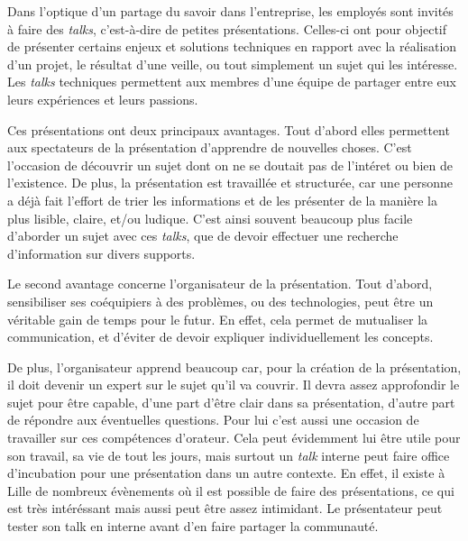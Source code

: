 \bigskip

Dans l'optique d'un partage du savoir dans l'entreprise, les employés
sont invités à faire des \emph{talks}, c'est-à-dire de petites
présentations. Celles-ci ont pour objectif de présenter certains enjeux
et solutions techniques en rapport avec la réalisation d'un projet, le
résultat d'une veille, ou tout simplement un sujet qui les intéresse.
Les \emph{talks} techniques permettent aux membres d'une équipe de
partager entre eux leurs expériences et leurs passions.

\bigskip

Ces présentations ont deux principaux avantages. Tout d'abord elles
permettent aux spectateurs de la présentation d'apprendre de nouvelles
choses. C'est l'occasion de découvrir un sujet dont on ne se doutait pas
de l'intéret ou bien de l'existence. De plus, la présentation est
travaillée et structurée, car une personne a déjà fait l'effort de trier
les informations et de les présenter de la manière la plus lisible,
claire, et/ou ludique. C'est ainsi souvent beaucoup plus facile
d'aborder un sujet avec ces \emph{talks}, que de devoir effectuer une
recherche d'information sur divers supports.

\bigskip

Le second avantage concerne l'organisateur de la présentation. Tout
d'abord, sensibiliser ses coéquipiers à des problèmes, ou des
technologies, peut être un véritable gain de temps pour le futur. En
effet, cela permet de mutualiser la communication, et d'éviter de devoir
expliquer individuellement les concepts.

\bigskip

De plus, l'organisateur apprend beaucoup car, pour la création de la
présentation, il doit devenir un expert sur le sujet qu'il va couvrir.
Il devra assez approfondir le sujet pour être capable, d'une part d'être
clair dans sa présentation, d'autre part de répondre aux éventuelles
questions. Pour lui c'est aussi une occasion de travailler sur ces
compétences d'orateur. Cela peut évidemment lui être utile pour son
travail, sa vie de tout les jours, mais surtout un \emph{talk} interne
peut faire office d'incubation pour une présentation dans un autre
contexte. En effet, il existe à Lille de nombreux évènements où il est
possible de faire des présentations, ce qui est très intéréssant mais
aussi peut être assez intimidant. Le présentateur peut tester son talk
en interne avant d'en faire partager la communauté.

\bigskip

